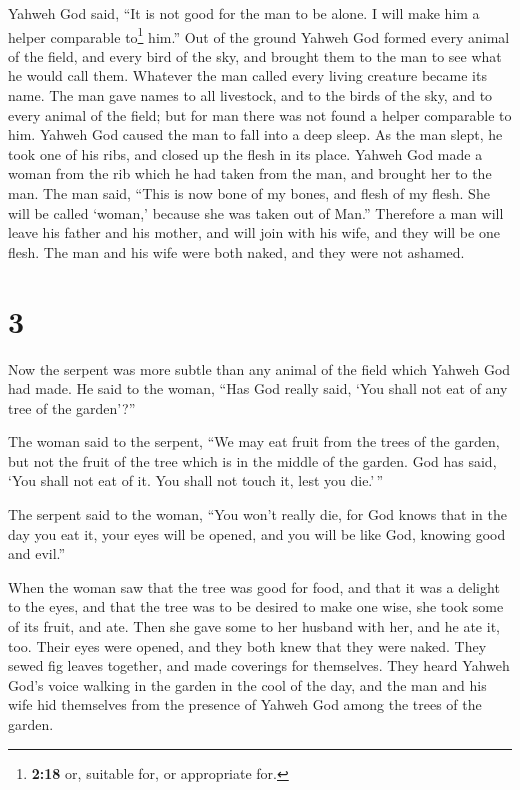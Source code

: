  Yahweh God said, ``It is not good for the man to be
alone. I will make him a helper comparable to\footnote{\textbf{2:18} or,
  suitable for, or appropriate for.} him.''  Out of the
ground Yahweh God formed every animal of the field, and every bird of
the sky, and brought them to the man to see what he would call them.
Whatever the man called every living creature became its name.
 The man gave names to all livestock, and to the birds of
the sky, and to every animal of the field; but for man there was not
found a helper comparable to him.  Yahweh God caused the
man to fall into a deep sleep. As the man slept, he took one of his
ribs, and closed up the flesh in its place.  Yahweh God
made a woman from the rib which he had taken from the man, and brought
her to the man.  The man said, ``This is now bone of my
bones, and flesh of my flesh. She will be called `woman,' because she
was taken out of Man.''  Therefore a man will leave his
father and his mother, and will join with his wife, and they will be one
flesh.  The man and his wife were both naked, and they
were not ashamed.

\hypertarget{section-2}{%
\section{3}\label{section-2}}

 Now the serpent was more subtle than any animal of the
field which Yahweh God had made. He said to the woman, ``Has God really
said, `You shall not eat of any tree of the garden'?''

 The woman said to the serpent, ``We may eat fruit from
the trees of the garden,  but not the fruit of the tree
which is in the middle of the garden. God has said, `You shall not eat
of it. You shall not touch it, lest you die.'\,''

 The serpent said to the woman, ``You won't really die,
 for God knows that in the day you eat it, your eyes will
be opened, and you will be like God, knowing good and evil.''

 When the woman saw that the tree was good for food, and
that it was a delight to the eyes, and that the tree was to be desired
to make one wise, she took some of its fruit, and ate. Then she gave
some to her husband with her, and he ate it, too.  Their
eyes were opened, and they both knew that they were naked. They sewed
fig leaves together, and made coverings for themselves. 
They heard Yahweh God's voice walking in the garden in the cool of the
day, and the man and his wife hid themselves from the presence of Yahweh
God among the trees of the garden.

